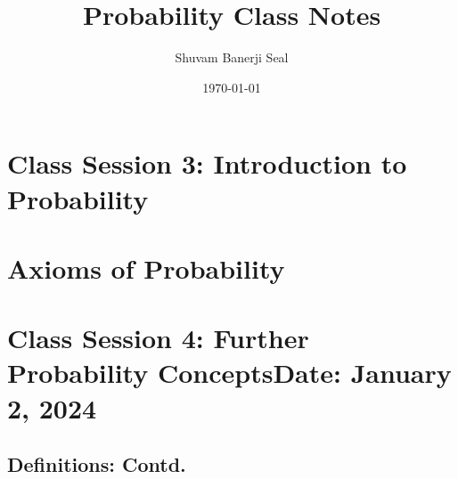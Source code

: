 \documentclass{article}
\title{Probability Class Notes}
\author{Shuvam Banerji Seal}
\date{\today}
\begin{document}
\maketitle

\tableofcontents

\section*{Class Session 3: Introduction to Probability}


\section{Axioms of Probability}

\section*{Class Session 4: Further Probability Concepts\hfill \normalfont Date: January 2, 2024}
\begin{mdframed}[style=MyFrame]
\subsection{Definitions: {Contd.}}
\end{mdframed}


\printindex
\end{document}
